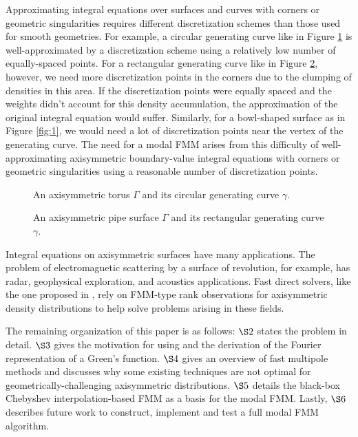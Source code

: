\documentclass[11pt, oneside]{article}   	%
\begin{document}
Approximating integral equations over surfaces and curves with corners or geometric singularities requires different discretization schemes than those used for smooth geometries. For example, a circular generating curve like in Figure \ref{fig:2} is well-approximated by a discretization scheme using a relatively low number of equally-spaced points. For a rectangular generating curve like in Figure \ref{fig:3}, however, we need more discretization points in the corners due to the clumping of densities in this area. If the discretization points were equally spaced and the weights didn't account for this density accumulation, the approximation of the original integral equation would suffer. Similarly, for a bowl-shaped surface as in Figure \ref{fig:1}, we would need a lot of discretization points near the vertex of the generating curve. The need for a modal FMM arises from this difficulty of well-approximating axisymmetric boundary-value integral equations with corners or geometric singularities using a reasonable number of discretization points.
\begin{figure}[h]
\caption{An axisymmetric torus $\Gamma$ and its circular generating curve $\gamma$.}
\label{fig:2}
\centering
\end{figure}
\begin{figure}[h]
\caption{An axisymmetric pipe surface $\Gamma$ and its rectangular generating curve $\gamma$.}
\label{fig:3}
\centering
\end{figure}

Integral equations on axisymmetric surfaces have many applications. The problem of electromagnetic scattering by a surface of revolution, for example, has radar, geophysical exploration, and acoustics applications. Fast direct solvers, like the one proposed in \cite{HMY}, rely on FMM-type rank observations for axisymmetric density distributions to help solve problems arising in these fields.

The remaining organization of this paper is as follows: $\S2$ states the problem in detail. $\S3$ gives the motivation for using and the derivation of the Fourier representation of a Green's function. $\S4$ gives an overview of fast multipole methods and discusses why some existing techniques are not optimal for geometrically-challenging axisymmetric distributions. $\S5$ details the black-box Chebyshev interpolation-based FMM as a basis for the modal FMM. Lastly, $\S6$ describes future work to construct, implement and test a full modal FMM algorithm.
\end{document}
